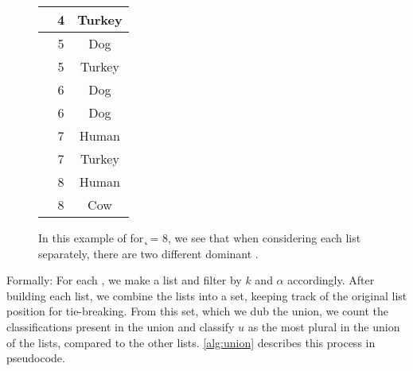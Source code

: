 \begin{figure}
{\begin{tabular}{c|c|c}
    \Sfive{}    & 4     & Turkey \\ \hline
    \Ssixt{}    & 5     & Dog \\ \hline
    \Sfive{}    & 5     & Turkey \\ \hline
    \Ssixt{}    & 6     & Dog \\ \hline
    \Sfive{}    & 6     & Dog \\ \hline
    \Ssixt{}    & 7     & Human \\ \hline
    \Sfive{}    & 7     & Turkey \\ \hline
    \Ssixt{}    & 8     & Human \\ \hline
    \Sfive{}    & 8     & Cow \\ \hline
\end{tabular}
}
\quad
{}
\caption{In this example of \runion{} for \k{} = 8, we see that when considering each \itsshort{} \knnlong{} list separately, there are two different dominant \spec{}. 
}
\label{fig:union:example}
\end{figure}

Formally: For each \compfunc{}, we make a \knnlong{} list and filter by $k$ and $\alpha$ accordingly.
After building each \knnlong{} list, we combine the lists into a set, keeping track of the original list position for tie-breaking.
From this set, which we dub the union, we count the classifications present in the union and classify $u$ as the most plural in the union of the lists, compared to the other lists.
\autoref{alg:union} describes this process in pseudocode.


